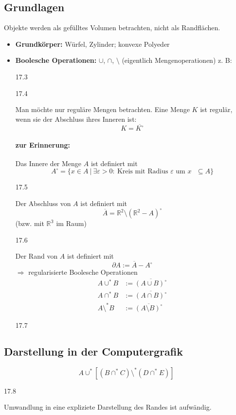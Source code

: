 \subsection{Grundlagen}
Objekte werden als gefülltes Volumen betrachten, nicht als Randflächen.
\begin{itemize}
 \item \textbf{Grundkörper:} Würfel, Zylinder; konvexe Polyeder
 \item \textbf{Boolesche Operationen:} $\cup$, $\cap$, $\setminus$ (eigentlich Mengenoperationen)
	z. B:
	\begin{center}
	17.3
	\end{center}
	\begin{center}
	17.4
	\end{center}
	Man möchte nur reguläre Mengen betrachten. Eine Menge $K$ ist regulär, wenn sie der Abschluss ihres Inneren ist:
	\[K = \overline{K^\circ}\]
	\paragraph*{zur Erinnerung:} Das Innere der Menge $A$ ist definiert mit
	\[A^\circ = \{x \in A\ |\ \exists\varepsilon > 0:\ \text{Kreis mit Radius $\varepsilon$ um $x$ $\subseteq A$}\}\]
	\begin{center}
	17.5
	\end{center}
	Der Abschluss von $A$ ist definiert mit
	\[\overline A = \mathbb{R}^2 \setminus (\mathbb{R}^2 - A)^\circ\]
	(bzw. mit $\mathbb{R^3}$ im Raum)
	\begin{center}
	17.6
	\end{center}
	Der Rand von $A$ ist definiert mit
	\[\partial A := \overline A - A^\circ\]
	$\Rightarrow$ regularisierte Boolesche Operationen
	\begin{align*}
	 A \cup^* B &:= \overline{(A \cup B)^\circ}\\
	 A \cap^* B &:= \overline{(A \cap B)^\circ}\\
	 A \setminus^* B &:= \overline{(A \setminus B)^\circ}
	\end{align*}
	\begin{center}
	 17.7
	\end{center}
\end{itemize}
\subsection{Darstellung in der Computergrafik}
\[A \cup^* \left[(B \cap^* C) \setminus^* (D \cap^* E)\right]\]
\begin{center}
 17.8
\end{center}
Umwandlung in eine expliziete Darstellung des Randes ist aufwändig.

